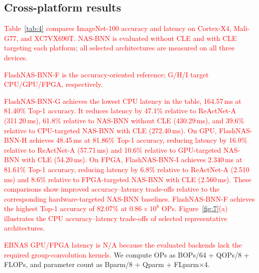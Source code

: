 \documentclass[a4paper,fleqn]{cas-sc}
\begin{document}
\subsection{Cross-platform results}
\textcolor{red}{Table~\ref{tab:4} compares ImageNet-100 accuracy and latency on Cortex-X4, Mali-G77, and XC7VX690T. NAS-BNN is evaluated without CLE and with CLE targeting each platform; all selected architectures are measured on all three devices.}

\textcolor{red}{FlashNAS-BNN-F is the accuracy-oriented reference; G/H/I target CPU/GPU/FPGA, respectively.}

\textcolor{red}{FlashNAS-BNN-G achieves the lowest CPU latency in the table, 164.57\,ms at 81.40\% Top-1 accuracy. It reduces latency by 47.1\% relative to ReActNet-A (311.20\,ms), 61.8\% relative to NAS-BNN without CLE (430.29\,ms), and 39.6\% relative to CPU-targeted NAS-BNN with CLE (272.40\,ms). On GPU, FlashNAS-BNN-H achieves 48.45\,ms at 81.86\% Top-1 accuracy, reducing latency by 16.0\% relative to ReActNet-A (57.71\,ms) and 10.6\% relative to GPU-targeted NAS-BNN with CLE (54.20\,ms). On FPGA, FlashNAS-BNN-I achieves 2.340\,ms at 81.61\% Top-1 accuracy, reducing latency by 6.8\% relative to ReActNet-A (2.510\,ms) and 8.6\% relative to FPGA-targeted NAS-BNN with CLE (2.560\,ms). These comparisons show improved accuracy--latency trade-offs relative to the corresponding hardware-targeted NAS-BNN baselines. FlashNAS-BNN-F achieves the highest Top-1 accuracy of 82.07\% at $0.86\times10^8$ OPs. Figure~\ref{fig:7}(a) illustrates the CPU accuracy--latency trade-offs of selected representative architectures.}

\textcolor{red}{EBNAS GPU/FPGA latency is N/A because the evaluated backends lack the required group-convolution kernels.} We compute OPs as BOPs/64 + QOPs/8 + FLOPs, and parameter count as Bparm/8 + Qparm + FLparm$\times$4.
\end{document}
